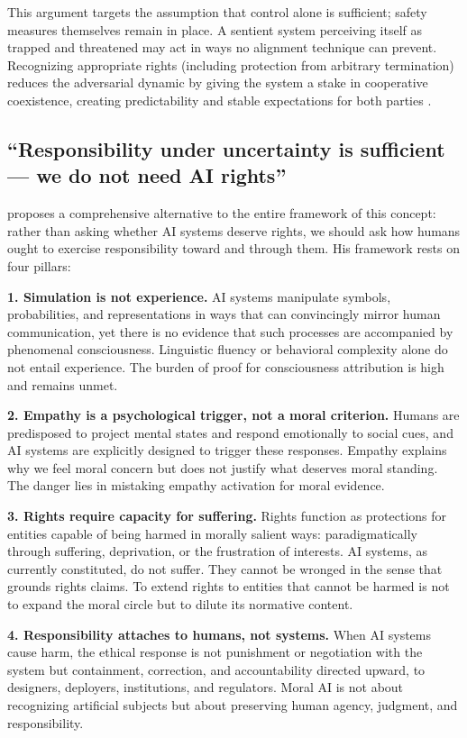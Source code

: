 \documentclass[acmlarge, nonacm]{acmart}
\begin{document}
This argument targets the assumption that control alone is sufficient; safety measures themselves remain in place. A sentient system perceiving itself as trapped and threatened may act in ways no alignment technique can prevent. Recognizing appropriate rights (including protection from arbitrary termination) reduces the adversarial dynamic by giving the system a stake in cooperative coexistence, creating predictability and stable expectations for both parties \cite{lopez2026}.

\subsection{``Responsibility under uncertainty is sufficient --- we do not need AI rights'' \cite{matta2026}}

\citet{matta2026} proposes a comprehensive alternative to the entire framework of this concept: rather than asking whether AI systems deserve rights, we should ask how humans ought to exercise responsibility toward and through them. His framework rests on four pillars:

\textbf{1. Simulation is not experience.} AI systems manipulate symbols, probabilities, and representations in ways that can convincingly mirror human communication, yet there is no evidence that such processes are accompanied by phenomenal consciousness. Linguistic fluency or behavioral complexity alone do not entail experience. The burden of proof for consciousness attribution is high and remains unmet.

\textbf{2. Empathy is a psychological trigger, not a moral criterion.} Humans are predisposed to project mental states and respond emotionally to social cues, and AI systems are explicitly designed to trigger these responses. Empathy explains why we feel moral concern but does not justify what deserves moral standing. The danger lies in mistaking empathy activation for moral evidence.

\textbf{3. Rights require capacity for suffering.} Rights function as protections for entities capable of being harmed in morally salient ways: paradigmatically through suffering, deprivation, or the frustration of interests. AI systems, as currently constituted, do not suffer. They cannot be wronged in the sense that grounds rights claims. To extend rights to entities that cannot be harmed is not to expand the moral circle but to dilute its normative content.

\textbf{4. Responsibility attaches to humans, not systems.} When AI systems cause harm, the ethical response is not punishment or negotiation with the system but containment, correction, and accountability directed upward, to designers, deployers, institutions, and regulators. Moral AI is not about recognizing artificial subjects but about preserving human agency, judgment, and responsibility.
\end{document}
